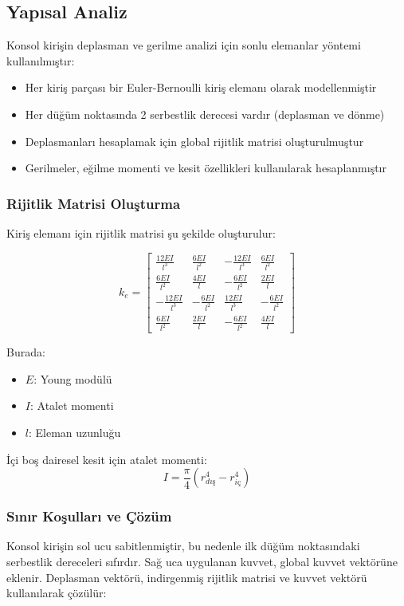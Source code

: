 \subsection{Yapısal Analiz}
Konsol kirişin deplasman ve gerilme analizi için sonlu elemanlar yöntemi kullanılmıştır:

\begin{itemize}
    \item Her kiriş parçası bir Euler-Bernoulli kiriş elemanı olarak modellenmiştir
    \item Her düğüm noktasında 2 serbestlik derecesi vardır (deplasman ve dönme)
    \item Deplasmanları hesaplamak için global rijitlik matrisi oluşturulmuştur
    \item Gerilmeler, eğilme momenti ve kesit özellikleri kullanılarak hesaplanmıştır
\end{itemize}

\subsubsection{Rijitlik Matrisi Oluşturma}
Kiriş elemanı için rijitlik matrisi şu şekilde oluşturulur:

\begin{equation}
k_e = \begin{bmatrix}
\frac{12EI}{l^3} & \frac{6EI}{l^2} & -\frac{12EI}{l^3} & \frac{6EI}{l^2} \\
\frac{6EI}{l^2} & \frac{4EI}{l} & -\frac{6EI}{l^2} & \frac{2EI}{l} \\
-\frac{12EI}{l^3} & -\frac{6EI}{l^2} & \frac{12EI}{l^3} & -\frac{6EI}{l^2} \\
\frac{6EI}{l^2} & \frac{2EI}{l} & -\frac{6EI}{l^2} & \frac{4EI}{l}
\end{bmatrix}
\end{equation}

Burada:
\begin{itemize}
    \item $E$: Young modülü
    \item $I$: Atalet momenti
    \item $l$: Eleman uzunluğu
\end{itemize}

İçi boş dairesel kesit için atalet momenti:
\begin{equation}
I = \frac{\pi}{4}(r_{dış}^4 - r_{iç}^4)
\end{equation}

\subsubsection{Sınır Koşulları ve Çözüm}
Konsol kirişin sol ucu sabitlenmiştir, bu nedenle ilk düğüm noktasındaki serbestlik dereceleri sıfırdır. Sağ uca uygulanan kuvvet, global kuvvet vektörüne eklenir. Deplasman vektörü, indirgenmiş rijitlik matrisi ve kuvvet vektörü kullanılarak çözülür:

